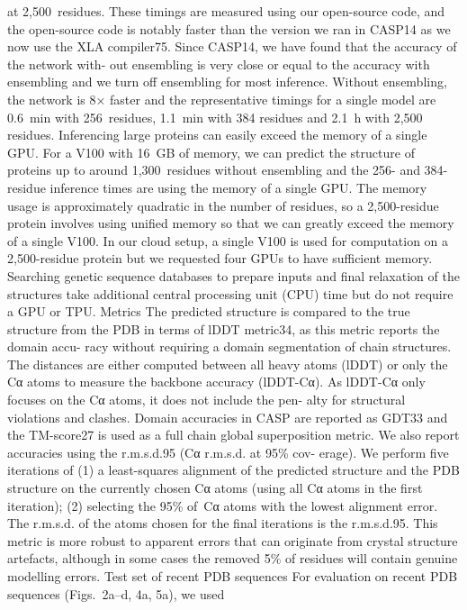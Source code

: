at 2,500 residues. These timings are measured using our open-source
code, and the open-source code is notably faster than the version we
ran in CASP14 as we now use the XLA compiler75.
Since CASP14, we have found that the accuracy of the network with-
out ensembling is very close or equal to the accuracy with ensembling
and we turn off ensembling for most inference. Without ensembling,
the network is 8× faster and the representative timings for a single
model are 0.6 min with 256 residues, 1.1 min with 384 residues and
2.1 h with 2,500 residues.
Inferencing large proteins can easily exceed the memory of a single
GPU. For a V100 with 16 GB of memory, we can predict the structure
of proteins up to around 1,300 residues without ensembling and the
256- and 384-residue inference times are using the memory of a single
GPU. The memory usage is approximately quadratic in the number of
residues, so a 2,500-residue protein involves using unified memory so
that we can greatly exceed the memory of a single V100. In our cloud
setup, a single V100 is used for computation on a 2,500-residue protein
but we requested four GPUs to have sufficient memory.
Searching genetic sequence databases to prepare inputs and final
relaxation of the structures take additional central processing unit
(CPU) time but do not require a GPU or TPU.
Metrics
The predicted structure is compared to the true structure from the
PDB in terms of lDDT metric34, as this metric reports the domain accu-
racy without requiring a domain segmentation of chain structures.
The distances are either computed between all heavy atoms (lDDT)
or only the Cα atoms to measure the backbone accuracy (lDDT-Cα).
As lDDT-Cα only focuses on the Cα atoms, it does not include the pen-
alty for structural violations and clashes. Domain accuracies in CASP
are reported as GDT33 and the TM-score27 is used as a full chain global
superposition metric.
We also report accuracies using the r.m.s.d.95 (Cα r.m.s.d. at 95\% cov-
erage). We perform five iterations of (1) a least-squares alignment of the
predicted structure and the PDB structure on the currently chosen Cα
atoms (using all Cα atoms in the first iteration); (2) selecting the 95\%
of Cα atoms with the lowest alignment error. The r.m.s.d. of the atoms
chosen for the final iterations is the r.m.s.d.95. This metric is more robust
to apparent errors that can originate from crystal structure artefacts,
although in some cases the removed 5\% of residues will contain genuine
modelling errors.
Test set of recent PDB sequences
For evaluation on recent PDB sequences (Figs. 2a–d, 4a, 5a), we used
